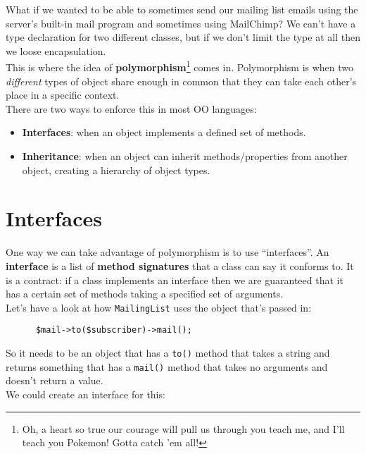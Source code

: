 What if we wanted to be able to sometimes send our mailing list emails using the server's built-in mail program and sometimes using MailChimp? We can't have a type declaration for two different classes, but if we don't limit the type at all then we loose encapsulation.
\\

This is where the idea of \textbf{polymorphism}\footnote{Oh, a heart so true our courage will pull us through you teach me, and I'll teach you Pokemon! Gotta catch 'em all!} comes in. Polymorphism is when two \textit{different} types of object share enough in common that they can take each other's place in a specific context.
\\

There are two ways to enforce this in most OO languages:

\begin{itemize}
    \item \textbf{Interfaces}: when an object implements a defined set of methods.
    \item \textbf{Inheritance}: when an object can inherit methods/properties from another object, creating a hierarchy of object types.
\end{itemize}


\section{Interfaces}

One way we can take advantage of polymorphism is to use ``interfaces''. An \textbf{interface} is a list of \textbf{method signatures} that a class can say it conforms to. It is a contract: if a class implements an interface then we are guaranteed that it has a certain set of methods taking a specified set of arguments.
\\

Let's have a look at how \texttt{MailingList} uses the object that's passed in:

\begin{verbatim}
      $mail->to($subscriber)->mail();
\end{verbatim}

So it needs to be an object that has a \texttt{to()} method that takes a string and returns something that has a \texttt{mail()} method that takes no arguments and doesn't return a value.
\\

We could create an interface for this:

